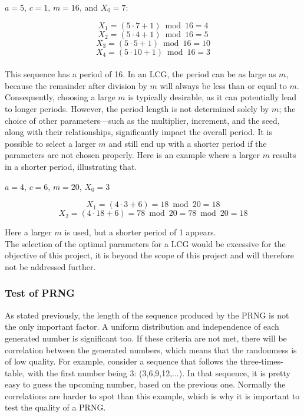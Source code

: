 \begin{center}
	$a = 5$, $c = 1$, $m = 16$, and $X_0 = 7$:
\end{center}

$$X_1 = (5 \cdot 7 + 1)\bmod 16 = 4 $$
$$X_2 = (5 \cdot 4 + 1) \bmod 16 = 5 $$
$$X_3 = (5 \cdot 5 + 1) \bmod 16 = 10 $$
$$X_4 = (5 \cdot 10 + 1) \bmod 16 = 3 $$
\\
\noindent This sequence has a period of 16. In an LCG, the period can be as large as $m$,
because the remainder after division by $m$ will always be less than or equal to
$m$. Consequently, choosing a large $m$ is typically desirable, as it can potentially
lead to longer periods. However, the period length is not determined solely by
$m$; the choice of other parameters—such as the multiplier, increment, and the
seed, along with their relationships, significantly impact the overall period. It
is possible to select a larger $m$ and still end up with a shorter period if the parameters are not chosen properly. Here is an example where a larger $m$ results in a shorter period, illustrating that.

\begin{center}
	$a=4$, $c=6$, $m=20$, $X_0=3$
\end{center}

$$X_1=(4 \cdot 3 +6)=18 \bmod 20=18$$ 
$$X_2=(4 \cdot 18+6)=78 \bmod 20=78 \bmod 20=18$$

\noindent Here a larger $m$ is used, but a shorter period of 1 appears. 
\newline \\
The selection of the optimal parameters for a LCG would be excessive for the objective of this project, it is beyond the scope of this project and will therefore not be addressed further.

\subsubsection{Test of PRNG}
As stated previously, the length of the sequence produced by the PRNG is not the only important factor. A uniform distribution and independence of each generated number is significant too. If these criteria are not met, there will be correlation between the generated numbers, which means that the randomness is of low quality. For example, consider a sequence that follows the three-times-table, with the first number being 3: (3,6,9,12,...). In that sequence, it is pretty easy to guess the upcoming number, based on the previous one. Normally the correlations are harder to spot than this example, which is why it is important to test the quality of a PRNG.
\newline

